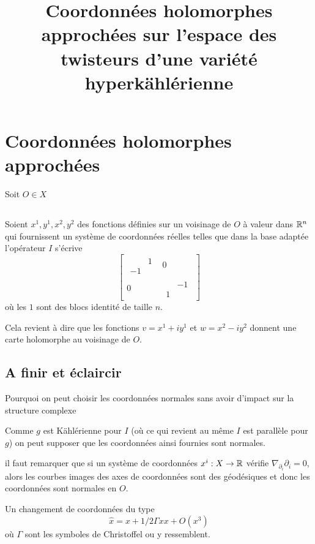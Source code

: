 \documentclass[11pt,draft,twocolumn,makeidx]{amsart}
\title{Coordonnées holomorphes approchées sur l'espace des twisteurs d'une variété hyperkählérienne}
\numberwithin{equation}{subsection}
\begin{document}

\section{Coordonnées holomorphes approchées} Soit $O \in X$

\subsection{} Soient $x^1,y^1,x^2,y^2$ des fonctions définies sur un voisinage de $O$ à valeur dans $\mathbb{R}^n$ qui fournissent un système de coordonnées réelles telles que dans la base adaptée l'opérateur $I$ s'écrive
\begin{equation}\label{I_holomorphic}
\left[
\begin{array}{c|c}
 \begin{matrix}
 & 1 \\ 
-1 & 
\end{matrix} & 0 \\ \hline
0 & \begin{matrix} 
 & -1 \\ 
1 & 
\end{matrix} 
\end{array}
\right]
\end{equation}
où les $1$ sont des blocs identité de taille $n$.

Cela revient à dire que les fonctions $v = x^1 + i y^1$ et $w = x^2 - iy^2$ donnent une carte holomorphe au voisinage de $O$.
\subsection{A finir et éclaircir} Pourquoi on peut choisir les coordonnées normales sans avoir d'impact sur la structure complexe \? {\tiny Comme $g$ est Kählérienne pour $I$ (où ce qui revient au même $I$ est parallèle pour $g$) on peut supposer que les coordonnées ainsi fournies sont normales.

il faut remarquer que si un système de coordonnées $x^i : X \rightarrow \mathbb{R}$ vérifie $\nabla_{\partial_i}\partial_i= 0$, alors les courbes images des axes de coordonnées sont des géodésiques et donc les coordonnées sont normales en $O$. 

Un changement de coordonnées du type
\begin{equation}
\hat{x} = x + 1/2 \Gamma x x + O(x^3)
\end{equation}
où $\Gamma$ sont les symboles de Christoffel ou y ressemblent.}
\end{document}
